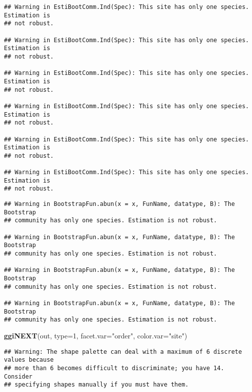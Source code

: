 \documentclass[
]{book}
\newenvironment{Shaded}{\begin{snugshade}}{\end{snugshade}}
\newcommand{\DataTypeTok}[1]{\textcolor[rgb]{0.13,0.29,0.53}{#1}}
\newcommand{\DecValTok}[1]{\textcolor[rgb]{0.00,0.00,0.81}{#1}}
\newcommand{\KeywordTok}[1]{\textcolor[rgb]{0.13,0.29,0.53}{\textbf{#1}}}
\newcommand{\NormalTok}[1]{#1}
\newcommand{\StringTok}[1]{\textcolor[rgb]{0.31,0.60,0.02}{#1}}
\begin{document}
\begin{verbatim}
## Warning in EstiBootComm.Ind(Spec): This site has only one species. Estimation is
## not robust.

## Warning in EstiBootComm.Ind(Spec): This site has only one species. Estimation is
## not robust.

## Warning in EstiBootComm.Ind(Spec): This site has only one species. Estimation is
## not robust.

## Warning in EstiBootComm.Ind(Spec): This site has only one species. Estimation is
## not robust.

## Warning in EstiBootComm.Ind(Spec): This site has only one species. Estimation is
## not robust.

## Warning in EstiBootComm.Ind(Spec): This site has only one species. Estimation is
## not robust.
\end{verbatim}

\begin{verbatim}
## Warning in BootstrapFun.abun(x = x, FunName, datatype, B): The Bootstrap
## community has only one species. Estimation is not robust.

## Warning in BootstrapFun.abun(x = x, FunName, datatype, B): The Bootstrap
## community has only one species. Estimation is not robust.

## Warning in BootstrapFun.abun(x = x, FunName, datatype, B): The Bootstrap
## community has only one species. Estimation is not robust.

## Warning in BootstrapFun.abun(x = x, FunName, datatype, B): The Bootstrap
## community has only one species. Estimation is not robust.
\end{verbatim}

\begin{Shaded}
\begin{Highlighting}[]
\KeywordTok{ggiNEXT}\NormalTok{(out, }\DataTypeTok{type=}\DecValTok{1}\NormalTok{, }\DataTypeTok{facet.var=}\StringTok{"order"}\NormalTok{, }\DataTypeTok{color.var=}\StringTok{"site"}\NormalTok{)}
\end{Highlighting}
\end{Shaded}

\begin{verbatim}
## Warning: The shape palette can deal with a maximum of 6 discrete values because
## more than 6 becomes difficult to discriminate; you have 14. Consider
## specifying shapes manually if you must have them.
\end{verbatim}
\end{document}
